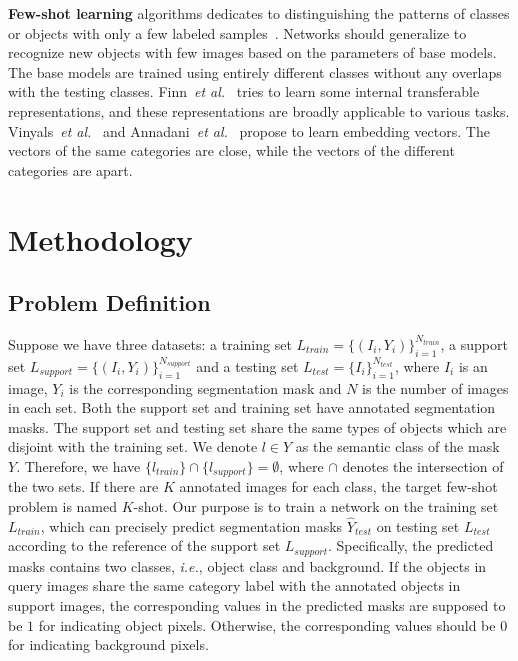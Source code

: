 \documentclass[journal]{IEEEtran}
\newcommand{\etal}{\emph{et al.}}
\newcommand{\ie}{\emph{i.e.}}
\begin{document}
\textbf{Few-shot learning} algorithms dedicates to distinguishing the patterns of classes or objects with only a few labeled samples~\cite{wu2019progressive,he2019asymptotic}. 
Networks should generalize to recognize new objects with few images based on the parameters of base models.
The base models are trained using entirely different classes without any overlaps with the testing classes.
Finn~\etal~\cite{finn2017model} tries to learn some internal transferable representations, and these representations are broadly applicable to various tasks.
Vinyals~\etal~\cite{vinyals2016matching} and Annadani~\etal~\cite{annadani2018preserving} propose to learn  embedding vectors. 
The vectors of the same categories are close, while the vectors of the different categories are apart.

	

\section{Methodology}
\subsection{Problem Definition}
Suppose we have three datasets: a training set $L_{train}=\{(I_i, Y_i)\}_{i=1}^{N_{train}}$, a support set $L_{support}=\{(I_i, Y_i)\}_{i=1}^{N_{support}}$ and a testing set $L_{test}=\{I_i\}_{i=1}^{N_{test}}$, where $I_i$ is an image, $Y_i$ is the corresponding segmentation mask and $N$ is the number of images in each set.
Both the support set and training set have annotated segmentation masks.
The support set and testing set share the same types of objects which are disjoint with the training set.
We denote $l\in Y$ as the semantic class of the mask $Y$. Therefore, we have $\{l_{train}\} \cap \{l_{support}\}=\emptyset$, 
where $\cap$ denotes the intersection of the two sets.
If there are $K$ annotated images for each class, the target few-shot problem is named $K$-shot.
Our purpose is to train a network on the training set $L_{train}$, which can precisely predict segmentation masks $\hat{Y}_{test}$ on testing set $L_{test}$ according to the reference of the support set $L_{support}$.
Specifically, the predicted masks contains two classes, \ie, object class and background. 
If the objects in query images share the same category label with the annotated objects in support images, the corresponding values in the predicted masks are supposed to be $1$ for indicating object pixels. Otherwise, the corresponding values should be $0$ for indicating background pixels.
\end{document}
